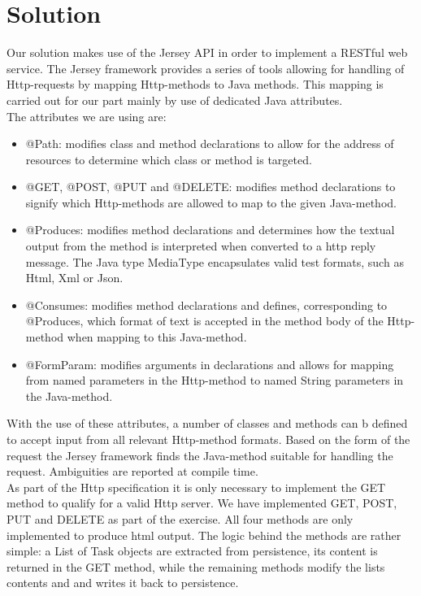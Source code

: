 \section{Solution}
\label{rest_solution}
Our solution makes use of the Jersey API in order to implement a RESTful web service. The Jersey framework provides a series of tools allowing for handling of Http-requests by mapping Http-methods to Java methods. This mapping is carried out for our part mainly by use of dedicated Java attributes.\\
The attributes we are using are:\\
\begin{itemize}
	\item @Path: modifies class and method declarations to allow for the address of resources to determine which class or method is targeted.
	\item @GET, @POST, @PUT and @DELETE: modifies method declarations to signify which Http-methods are allowed to map to the given Java-method.
	\item @Produces: modifies method declarations and determines how the textual output from the method is interpreted when converted to a http reply message. The Java type MediaType encapsulates valid test formats, such as Html, Xml or Json.
	\item @Consumes: modifies method declarations and defines, corresponding to @Produces, which format of text is accepted in the method body of the Http-method when mapping to this Java-method. 
	\item @FormParam: modifies arguments in declarations and allows for mapping from named parameters in the Http-method to named String parameters in the Java-method.
\end{itemize}
With the use of these attributes, a number of classes and methods can b defined to accept input from all relevant Http-method formats. Based on the form of the request the Jersey framework finds the Java-method suitable for handling the request. Ambiguities are reported at compile time.\\
As part of the Http specification it is only necessary to implement the GET method to qualify for a valid Http server. We have implemented GET, POST, PUT and DELETE as part of the exercise. All four methods are only implemented to produce html output. The logic behind the methods are rather simple: a List of Task objects are extracted from persistence, its content is returned in the GET method, while the remaining methods modify the lists contents and and writes it back to persistence.\\

